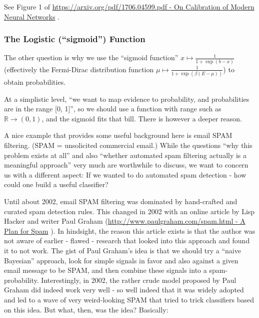 \documentclass[11pt]{article}
\begin{document}
See Figure 1 of
\href{https://arxiv.org/pdf/1706.04599.pdf}{https://arxiv.org/pdf/1706.04599.pdf
- On Calibration of Modern Neural Networks} \cite{guo2017calibration}.

    \hypertarget{the-logistic-sigmoid-function}{%
\subsubsection{The Logistic (``sigmoid'')
Function}\label{the-logistic-sigmoid-function}}

The other question is why we use the ``sigmoid function''
\(x\mapsto\frac{1}{1+\exp(b-x)}\) (effectively the Fermi-Dirac
distribution function \(\mu\mapsto\frac{1}{1+\exp(\beta(E-\mu))}\)) to
obtain probabilities.

At a simplistic level, ``we want to map evidence to probability, and
probabilities are in the range {[}0, 1{]}'', so we should use a function
with range such as \({\mathbb R}\to(0, 1)\), and the sigmoid fits that
bill. There is however a deeper reason.

A nice example that provides some useful background here is email SPAM
filtering. (SPAM = unsolicited commercial email.) While the questions
``why this problem exists at all'' and also ``whether automated spam
filtering actually is a meaningful approach'' very much are worthwhile
to discuss, we want to concern us with a different aspect: If we wanted
to do automated spam detection - how could one build a useful
classifier?

Until about 2002, email SPAM filtering was dominated by hand-crafted and
curated spam detection rules. This changed in 2002 with an online
article by Lisp Hacker and writer Paul Graham
(\href{http://www.paulgraham.com/spam.html}{http://www.paulgraham.com/spam.html
- A Plan for Spam} \cite{graham2002plan}). In hindsight, the reason this article exists is
that the author was not aware of earlier - flawed - research that looked
into this approach and found it to not work. The gist of Paul Graham's
idea is that we should try a ``naive Bayesian'' approach, look for
simple signals in favor and also against a given email message to be
SPAM, and then combine these signals into a spam-probability.
Interestingly, in 2002, the rather crude model proposed by Paul Graham
did indeed work very well - so well indeed that it was widely adopted
and led to a wave of very weird-looking SPAM that tried to trick
classifiers based on this idea. But what, then, was the idea? Basically:
\end{document}
